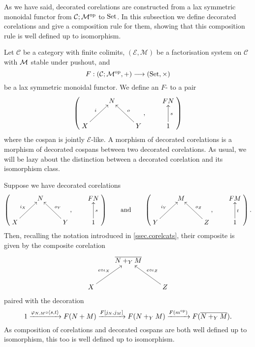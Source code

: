 As we have said, decorated corelations are constructed from a lax symmetric
monoidal functor from $\mathcal C;\mathcal M^{\mathrm{op}}$ to $\mathrm{Set}$. In this subsection we define
decorated corelations and give a composition rule for them, showing that this
composition rule is well defined up to isomorphism.

\begin{definition}
  Let $\mathcal C$ be a category with finite colimits, $(\mathcal E, \mathcal
  M)$ be a factorisation system on $\mathcal C$ with $\mathcal M$ stable under
  pushout, and 
  \[
    F: (\mathcal C;\mathcal M^{\mathrm{op}},+) \longrightarrow (\mathrm{Set}, \times)
  \]
  be a lax symmetric monoidal functor.  We define an $F$- to a pair
  \[
    \left(
    \begin{aligned}
      \xymatrix{
	& N \\  
	X \ar[ur]^{i} && Y \ar[ul]_{o}
      }
    \end{aligned}
    ,
    \qquad
    \begin{aligned}
      \xymatrix{
	FN \\
	1 \ar[u]_{s}
      }
    \end{aligned}
    \right)
  \]
  where the cospan is jointly $\mathcal E$-like. A morphism of decorated
  corelations is a morphism of decorated cospans between two decorated
  corelations.  As usual, we will be lazy about the distinction between a
  decorated corelation and its isomorphism class.
\end{definition}


Suppose we have decorated corelations
\[
  \left(
  \begin{aligned}
    \xymatrix{
      & N \\  
      X \ar[ur]^{i_X} && Y \ar[ul]_{o_Y}
    }
  \end{aligned}
  ,
  \qquad
  \begin{aligned}
    \xymatrix{
      FN \\
      1 \ar[u]_{s}
    }
  \end{aligned}
  \right)
  \qquad
  \mbox{and}
  \qquad
  \left(
  \begin{aligned}
    \xymatrix{
      & M \\  
      Y \ar[ur]^{i_Y} && Z \ar[ul]_{o_Z}
    }
  \end{aligned}
  ,
  \qquad
  \begin{aligned}
    \xymatrix{
      FM \\
      1 \ar[u]_{t}
    }
  \end{aligned}
  \right).
\]
Then, recalling the notation introduced in
\textsection\ref{ssec.corelcats}, their composite is given by the composite
corelation
\[
  \xymatrix{
    & \overline{N+_YM} \\  
    X \ar[ur]^{e\circ \iota_X} && Z \ar[ul]_{e \circ \iota_Z}
  }
\]
paired with the decoration
\[
  1 \xrightarrow{\varphi_{N,M}\circ\langle s,t\rangle} F(N+M)
  \xrightarrow{F[j_N,j_M]} F(N+_YM) \xrightarrow{F(m^{\mathrm{op}})} F(\overline{N+_YM}).
\]
As composition of corelations and decorated cospans are both well defined up to
isomorphism, this too is well defined up to isomorphism. 


